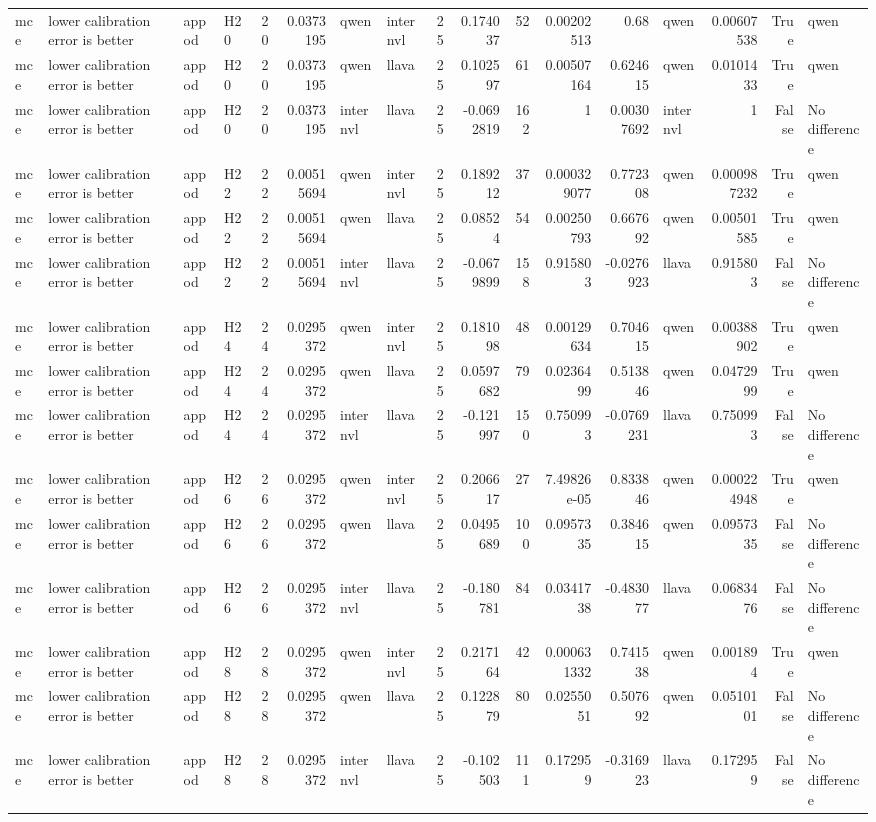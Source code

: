 \begin{longtable}{llllrrllrrrrrlrrl}
mce & lower calibration error is better & appod & H20 & 20 & 0.0373195 & qwen & internvl & 25 & 0.174037 & 52 & 0.00202513 & 0.68 & qwen & 0.00607538 & True & qwen \\
mce & lower calibration error is better & appod & H20 & 20 & 0.0373195 & qwen & llava & 25 & 0.102597 & 61 & 0.00507164 & 0.624615 & qwen & 0.0101433 & True & qwen \\
mce & lower calibration error is better & appod & H20 & 20 & 0.0373195 & internvl & llava & 25 & -0.0692819 & 162 & 1 & 0.00307692 & internvl & 1 & False & No difference \\
mce & lower calibration error is better & appod & H22 & 22 & 0.00515694 & qwen & internvl & 25 & 0.189212 & 37 & 0.000329077 & 0.772308 & qwen & 0.000987232 & True & qwen \\
mce & lower calibration error is better & appod & H22 & 22 & 0.00515694 & qwen & llava & 25 & 0.08524 & 54 & 0.00250793 & 0.667692 & qwen & 0.00501585 & True & qwen \\
mce & lower calibration error is better & appod & H22 & 22 & 0.00515694 & internvl & llava & 25 & -0.0679899 & 158 & 0.915803 & -0.0276923 & llava & 0.915803 & False & No difference \\
mce & lower calibration error is better & appod & H24 & 24 & 0.0295372 & qwen & internvl & 25 & 0.181098 & 48 & 0.00129634 & 0.704615 & qwen & 0.00388902 & True & qwen \\
mce & lower calibration error is better & appod & H24 & 24 & 0.0295372 & qwen & llava & 25 & 0.0597682 & 79 & 0.0236499 & 0.513846 & qwen & 0.0472999 & True & qwen \\
mce & lower calibration error is better & appod & H24 & 24 & 0.0295372 & internvl & llava & 25 & -0.121997 & 150 & 0.750993 & -0.0769231 & llava & 0.750993 & False & No difference \\
mce & lower calibration error is better & appod & H26 & 26 & 0.0295372 & qwen & internvl & 25 & 0.206617 & 27 & 7.49826e-05 & 0.833846 & qwen & 0.000224948 & True & qwen \\
mce & lower calibration error is better & appod & H26 & 26 & 0.0295372 & qwen & llava & 25 & 0.0495689 & 100 & 0.0957335 & 0.384615 & qwen & 0.0957335 & False & No difference \\
mce & lower calibration error is better & appod & H26 & 26 & 0.0295372 & internvl & llava & 25 & -0.180781 & 84 & 0.0341738 & -0.483077 & llava & 0.0683476 & False & No difference \\
mce & lower calibration error is better & appod & H28 & 28 & 0.0295372 & qwen & internvl & 25 & 0.217164 & 42 & 0.000631332 & 0.741538 & qwen & 0.001894 & True & qwen \\
mce & lower calibration error is better & appod & H28 & 28 & 0.0295372 & qwen & llava & 25 & 0.122879 & 80 & 0.0255051 & 0.507692 & qwen & 0.0510101 & False & No difference \\
mce & lower calibration error is better & appod & H28 & 28 & 0.0295372 & internvl & llava & 25 & -0.102503 & 111 & 0.172959 & -0.316923 & llava & 0.172959 & False & No difference \\
\end{longtable}
